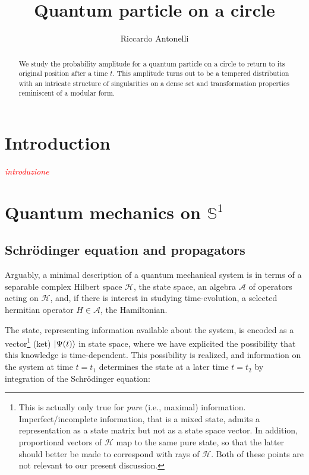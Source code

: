 \documentclass{article}
\title{Quantum particle on a circle}
\author{Riccardo Antonelli}
\newcommand{\ess}{\ensuremath{\mathbb{S}}}
\newcommand{\hil}{\ensuremath{\mathcal{H}}}
\newcommand{\cmnt}[1]{\textcolor{red}{\emph{#1}}}
\begin{document}
\maketitle

\begin{abstract}
    We study the probability amplitude for a quantum particle on a circle to return to its original position after a time $t$. This amplitude turns out to be a tempered distribution with an intricate structure of singularities on a dense set and transformation properties reminiscent of a modular form.
\end{abstract}

\tableofcontents

\section{Introduction}

\cmnt{introduzione}

\section{Quantum mechanics on $\ess^1$}
\subsection{Schr\"odinger equation and propagators}

Arguably, a minimal description of a quantum mechanical system is in terms of a separable complex Hilbert space $\hil$, the state space, an algebra $\mathcal{A}$ of operators acting on $\hil$, and, if there is interest in studying time-evolution, a selected hermitian operator $H \in \mathcal{A}$, the Hamiltonian.  

The state, representing information available about the system, is encoded as a vector\footnote{This is actually only true for \emph{pure} (i.e., maximal) information. Imperfect/incomplete information, that is a mixed state, admits a representation as a state matrix but not as a state space vector. In addition, proportional vectors of $\hil$ map to the same pure state, so that the latter should better be made to correspond with rays of $\hil$. Both of these points are not relevant to our present discussion.} (ket) $\ket{\Psi(t)}$ in state space, where we have explicited the possibility that this knowledge is time-dependent. This possibility is realized, and information on the system at time $t=t_1$ determines the state at a later time $t=t_2$ by integration of the Schr\"odinger equation:
\end{document}
